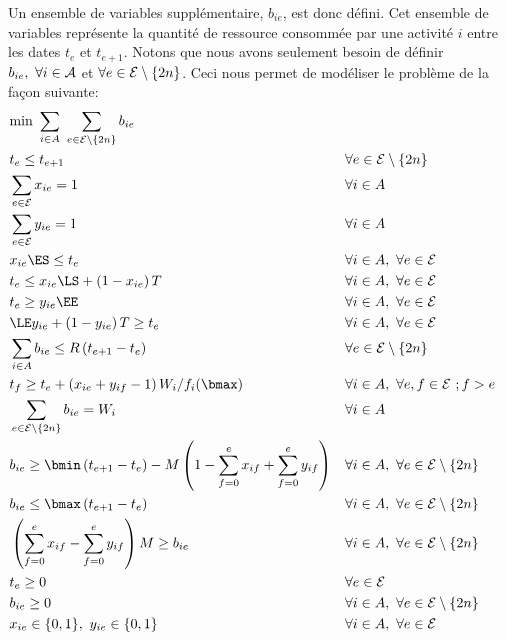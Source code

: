 Un ensemble de variables supplémentaire, $b_{ie}$, est donc
défini. Cet ensemble de variables représente la quantité de ressource
consommée par une activité $i$ entre les dates $t_e$ et
$t_{e+1}$. Notons que nous avons seulement besoin de définir $b_{ie},\
\forall i \in {\cal A}$ et $\forall e \in {\cal E} \setminus\{2n\}$. Ceci nous permet de
modéliser le problème de la façon suivante:
{\small
\begin{align}
& \text{min } \sum_{i\in A}\ \sum_{e\in \E\setminus\{2n\}} b_{ie} 
\label{obj_CECSP_SE}\\
&t_e \le t_{e+1} & & \forall e \in
\E\setminus\{2n\} \label{ordre_CECSP_SE}\\
 &\sum_{e\in \E} x_{ie} =1 & & \forall i \in
A \label{start_CECSP_SE}\\
 &\sum_{e\in \E} y_{ie} =1 & & \forall i \in A \label{end_CECSP_SE}\\
 &x_{ie}\ES \le t_e & & \forall i \in A,\ \forall e \in
\E \label{twx1_CECSP_SE}\\
 &t_e \le x_{ie}\LS+ \left(1-x_{ie}\right)T & & \forall i \in A,\
\forall e \in \E \label{twx2_CECSP_SE}\\
 &t_e \ge y_{ie}\EE & & \forall i \in A ,\ \forall e \in \E 
 \label{twy1_CECSP_SE}\\
 &\LE y_{ie} + \left(1-y_{ie}\right)T \ge t_e & & \forall i \in A,\ \forall e \in \E 
 \label{twy2_CECSP_SE}\\
 &\sum_{i \in A} b_{ie} \le R \left(t_{e+1}- t_e\right) & & 
 \forall e \in \E\setminus\{2n\} \label{res_CECSP_SE}\\
 &t_f \ge t_e +  \left(x_{ie} + y_{if} -1\right) W_i/f_i(\bmax) & & \forall i \in A,\ 
 \forall e,f \in \E\ ; f>e \label{dur_CECSP_SE}\\
 &\sum_{e\in \E\setminus\{2n\}} b_{ie} = W_i  & & \forall i \in A 
 \label{nrj_CECSP_SE}\\
&b_{ie} \ge \bmin \left(t_{e+1}-t_e\right) 
- M \left(1 - \sum_{f=0}^e x_{if} +\sum_{f=0}^e y_{if}\right) 
& &  \forall i \in A,\ \forall e \in \E\setminus\{2n\} \label{bmin_CECSP_SE}\\
&b_{ie} \le \bmax  \left(t_{e+1} - t_e\right) & &
\forall i \in A,\ \forall e \in \E\setminus\{2n\} \label{bmax_CECSP_SE}\\
& \left(\sum_{f=0}^{e} x_{if} - \sum_{f=0}^e y_{if}\right)M\ge b_{ie} & &
 \forall i \in A,\ \forall e \in \E\setminus\{2n\} \label{res0_CECSP_SE}\\
&t_e \ge 0 & & \forall e \in \E \label{eq36}\\
& b_{ie} \ge 0 & & \forall i \in A,\ \forall e \in \E\setminus\{2n\} 
\label{Bb_CECSP_SE}\\
&x_{ie} \in \{0,1\},\ y_{ie} \in \{0,1\} & & 
\forall i \in A,\ \forall e \in \E \label{eq39}
\end{align}
}
